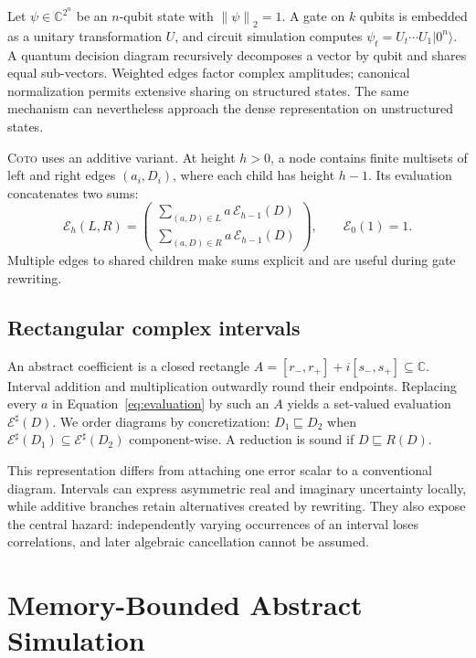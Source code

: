 \documentclass[sigconf,nonacm]{acmart}
\newcommand{\tool}{\textsc{Coto}}
\newcommand{\C}{\mathbb{C}}
\newcommand{\norm}[1]{\left\lVert #1\right\rVert}
\begin{document}
Let $\psi\in\C^{2^n}$ be an $n$-qubit state with $\norm{\psi}_2=1$. A gate on $k$ qubits is
embedded as a unitary transformation $U$, and circuit simulation computes
$\psi_t=U_t\cdots U_1\lvert 0^n\rangle$. A quantum decision diagram recursively decomposes a
vector by qubit and shares equal sub-vectors. Weighted edges factor complex amplitudes;
canonical normalization permits extensive sharing on structured states. The same mechanism
can nevertheless approach the dense representation on unstructured states.

\tool{} uses an additive variant. At height $h>0$, a node contains finite multisets of left
and right edges $(a_i,D_i)$, where each child has height $h-1$. Its evaluation concatenates
two sums:
\begin{equation}
 \mathcal E_h(L,R)=
 \begin{pmatrix}
   \sum_{(a,D)\in L} a\,\mathcal E_{h-1}(D)\\
   \sum_{(a,D)\in R} a\,\mathcal E_{h-1}(D)
 \end{pmatrix},
 \qquad \mathcal E_0(\boxed{1})=1.
 \label{eq:evaluation}
\end{equation}
Multiple edges to shared children make sums explicit and are useful during gate rewriting.

\subsection{Rectangular complex intervals}

An abstract coefficient is a closed rectangle
$A=[r_-,r_+]+i[s_-,s_+]\subseteq\C$. Interval addition and multiplication outwardly round
their endpoints. Replacing every $a$ in Equation~\ref{eq:evaluation} by such an $A$ yields a
set-valued evaluation $\mathcal E^\sharp(D)$. We order diagrams by concretization:
$D_1\sqsubseteq D_2$ when $\mathcal E^\sharp(D_1)\subseteq
\mathcal E^\sharp(D_2)$ component-wise. A reduction is sound if $D\sqsubseteq R(D)$.

This representation differs from attaching one error scalar to a conventional diagram.
Intervals can express asymmetric real and imaginary uncertainty locally, while additive
branches retain alternatives created by rewriting. They also expose the central hazard:
independently varying occurrences of an interval loses correlations, and later algebraic
cancellation cannot be assumed.

\section{Memory-Bounded Abstract Simulation}
\end{document}
